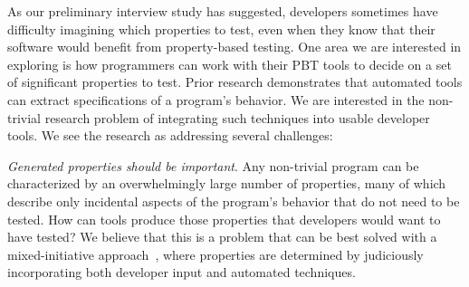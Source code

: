 


As our preliminary interview study has suggested, developers sometimes have difficulty imagining which properties to test, even when they know that their software would benefit from property-based testing. One area we are interested in exploring is how programmers can work with their PBT tools to decide on a set of significant properties to test.
Prior research demonstrates that automated tools can extract specifications of a program's behavior\cite{ammons2002mining,le2018deep,claessen2010quickspec}. We are interested in the non-trivial research problem of integrating such techniques into usable developer tools. We see the research as addressing several challenges:

\textit{Generated properties should be \emph{important}}. Any non-trivial program can be characterized by an overwhelmingly large number of properties, many of which describe only incidental aspects of the program's behavior that do not need to be tested. How can tools produce those properties that developers would want to have tested? We believe that this is a problem that can be best solved with a mixed-initiative approach~\cite{allen1999mixed}, where properties are determined by judiciously incorporating both developer input and automated techniques.

